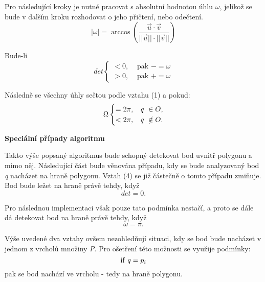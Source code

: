 \par Pro následující kroky je nutné pracovat s absolutní hodnotou úhlu $\omega$, jelikož se bude v dalším kroku rozhodovat o jeho přičtení, nebo odečtení.
\begin{equation}|\omega| = \arccos\left(\frac{\vec{u}\cdot\vec{v}}{||\vec{u}||\cdot||\vec{v}||}\right)\end{equation}

\par Bude-li
\begin{equation} det\begin{cases} < 0, & \text{{ pak }$-=\omega$} \\ > 0,& \text{{ pak }$+=\omega$} \end{cases}\end{equation}

\par Následně se všechny úhly sečtou podle vztahu (1) a pokud:
\begin{equation} \Omega\begin{cases} = 2\pi, & \text{\emph{q}}\ \in O, \\ < 2\pi,& \text{\emph{q}} \ \notin O. \\\end{cases}\end{equation}

\par {\large\textbf{Speciální případy algoritmu} }
\par Takto výše popsaný algoritmus bude schopný detekovat bod uvnitř polygonu a mimo něj. Následující část bude věnována případu, kdy se bude analyzovaný bod \emph{q} nacházet na hraně polygonu. Vztah (4) se již částečně o tomto případu zmiňuje. Bod bude ležet na hraně právě tehdy, když
\begin{equation}det = 0.\end{equation}

\par Pro následnou implementaci však pouze tato podmínka nestačí, a proto se dále dá detekovat bod na hraně právě tehdy, když
\begin{equation}\omega = \pi.\end{equation}

\par Výše uvedené dva vztahy ovšem nezohledňují situaci, kdy se bod bude nacházet v jednom z vrcholů množiny \emph{P}. Pro ošetření této možnosti se využije podmínky:
\begin{equation}\text{if\emph{ q}} = p_i\end{equation}
pak se bod nachází ve vrcholu - tedy na hraně polygonu.

